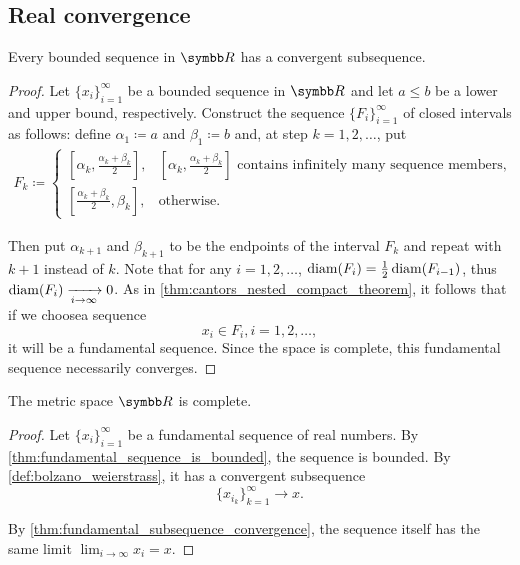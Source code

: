 \subsection{Real convergence}\label{subsec:real_vector_space_convergence}

\begin{theorem}\label{def:bolzano_weierstrass}
  Every bounded sequence in \( \BR \) has a convergent subsequence.
\end{theorem}
\begin{proof}
  Let \( \{ x_i \}_{i=1}^\infty \) be a bounded sequence in \( \BR \) and let \( a \leq b \) be a lower and upper bound, respectively. Construct the sequence \( \{ F_i \}_{i=1}^\infty \) of closed intervals as follows: define \( \alpha_1 \coloneqq a \) and \( \beta_1 \coloneqq b \) and, at step \( k = 1, 2, \ldots \), put
  \begin{align*}
    F_k \coloneqq \begin{cases}
      [\alpha_k, \tfrac{\alpha_k+\beta_k} 2], &[\alpha_k, \tfrac{\alpha_k+\beta_k} 2]\text{ contains infinitely many sequence members}, \\
      [\tfrac{\alpha_k+\beta_k} 2, \beta_k], &\text{otherwise}.
    \end{cases}
  \end{align*}

  Then put \( \alpha_{k+1} \) and \( \beta_{k+1} \) to be the endpoints of the interval \( F_k \) and repeat with \( k+1 \) instead of \( k \). Note that for any \( i = 1, 2, \ldots \), \( \operatorname{diam}(F_i) = \tfrac 1 2 \operatorname{diam}(F_{i-1}) \), thus \( \operatorname{diam}(F_i) \xrightarrow[i \to \infty]{} 0 \). As in \cref{thm:cantors_nested_compact_theorem}, it follows that if we choose\AOC a sequence
  \begin{equation*}
    x_i \in F_i, i = 1, 2, \ldots,
  \end{equation*}
  it will be a fundamental sequence. Since the space is complete, this fundamental sequence necessarily converges.
\end{proof}

\begin{theorem}\label{def:real_numbers_complete_metric_space}
  The metric space \( \BR \) is complete.
\end{theorem}
\begin{proof}
  Let \( \{ x_i \}_{i=1}^\infty \) be a fundamental sequence of real numbers. By \cref{thm:fundamental_sequence_is_bounded}, the sequence is bounded. By \cref{def:bolzano_weierstrass}, it has a convergent subsequence
  \begin{equation*}
    \{ x_{i_k} \}_{k=1}^\infty \to x.
  \end{equation*}

  By \cref{thm:fundamental_subsequence_convergence}, the sequence itself has the same limit \( \lim_{i \to \infty} x_i = x \).
\end{proof}


